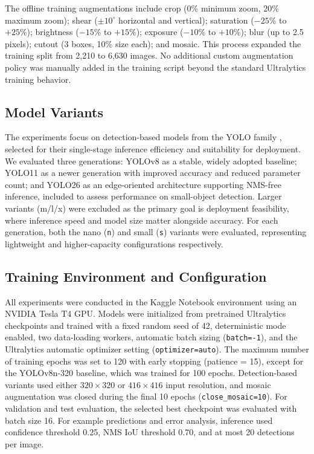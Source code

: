 ﻿\documentclass[11pt]{article}
\begin{document}
The offline training augmentations include crop (0\% minimum zoom, 20\% maximum zoom); shear ($\pm10^\circ$ horizontal and vertical); saturation ($-25\%$ to $+25\%$); brightness ($-15\%$ to $+15\%$); exposure ($-10\%$ to $+10\%$); blur (up to 2.5 pixels); cutout (3 boxes, 10\% size each); and mosaic. This process expanded the training split from 2,210 to 6,630 images. No additional custom augmentation policy was manually added in the training script beyond the standard Ultralytics training behavior.

\subsection{Model Variants}

The experiments focus on detection-based models from the YOLO
family \citep{redmon2016yolo}, selected for their single-stage
inference efficiency and suitability for deployment. We evaluated
three generations: YOLOv8 \citep{ultralytics_yolov8} as a stable,
widely adopted baseline; YOLO11 \citep{ultralytics_yolo11} as a
newer generation with improved accuracy and reduced parameter count;
and YOLO26 \citep{ultralytics_yolo26} as an edge-oriented
architecture supporting NMS-free inference, included to assess
performance on small-object detection. Larger variants (m/l/x) were
excluded as the primary goal is deployment feasibility, where
inference speed and model size matter alongside accuracy. For each
generation, both the nano (\texttt{n}) and small (\texttt{s})
variants were evaluated, representing lightweight and
higher-capacity configurations respectively.

\subsection{Training Environment and Configuration}

All experiments were conducted in the Kaggle Notebook environment using an NVIDIA Tesla T4 GPU. Models were initialized from pretrained Ultralytics checkpoints and trained with a fixed random seed of 42, deterministic mode enabled, two data-loading workers, automatic batch sizing (\texttt{batch=-1}), and the Ultralytics automatic optimizer setting (\texttt{optimizer=auto}). The maximum number of training epochs was set to 120 with early stopping (patience = 15), except for the YOLOv8n-320 baseline, which was trained for 100 epochs. Detection-based variants used either $320 \times 320$ or $416 \times 416$ input resolution, and mosaic augmentation was closed during the final 10 epochs (\texttt{close\_mosaic=10}). For validation and test evaluation, the selected best checkpoint was evaluated with batch size 16. For example predictions and error analysis, inference used confidence threshold 0.25, NMS IoU threshold 0.70, and at most 20 detections per image.
\end{document}
